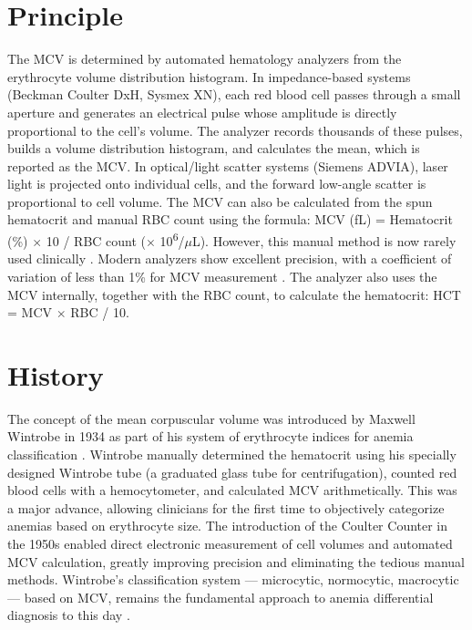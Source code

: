 \section*{Principle}
The MCV is determined by automated hematology analyzers from the erythrocyte volume distribution histogram. In impedance-based systems (Beckman Coulter DxH, Sysmex XN), each red blood cell passes through a small aperture and generates an electrical pulse whose amplitude is directly proportional to the cell's volume. The analyzer records thousands of these pulses, builds a volume distribution histogram, and calculates the mean, which is reported as the MCV. In optical/light scatter systems (Siemens ADVIA), laser light is projected onto individual cells, and the forward low-angle scatter is proportional to cell volume. The MCV can also be calculated from the spun hematocrit and manual RBC count using the formula: MCV (fL) = Hematocrit (\%)  $\times$ 10 /  RBC count  ($\times$ 10\textsuperscript{6}/$\mu$L). However, this manual method is now rarely used clinically \cite{bain2017dacie}. Modern analyzers show excellent precision, with a coefficient of variation of less than 1\% for MCV measurement \cite{tietz2023textbook}. The analyzer also uses the MCV internally, together with the RBC count, to calculate the hematocrit: HCT = MCV $\times$ RBC / 10.

\section*{History}
The concept of the mean corpuscular volume was introduced by Maxwell Wintrobe in 1934 as part of his system of erythrocyte indices for anemia classification \cite{wintrobe1934anemia}. Wintrobe manually determined the hematocrit using his specially designed Wintrobe tube (a graduated glass tube for centrifugation), counted red blood cells with a hemocytometer, and calculated MCV arithmetically. This was a major advance, allowing clinicians for the first time to objectively categorize anemias based on erythrocyte size. The introduction of the Coulter Counter in the 1950s enabled direct electronic measurement of cell volumes and automated MCV calculation, greatly improving precision and eliminating the tedious manual methods. Wintrobe's classification system --- microcytic, normocytic, macrocytic --- based on MCV, remains the fundamental approach to anemia differential diagnosis to this day \cite{kaushansky2021williams}.

